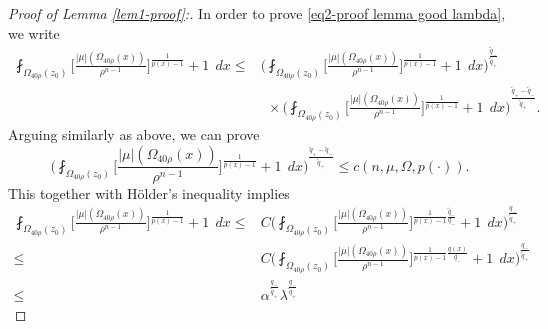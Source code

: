 \documentclass[a4paper,10pt]{amsart}
\newcommand{\f}{\frac}
\newcommand{\Om}{\Omega}
\begin{document}
\begin{proof}[Proof of Lemma \ref{lem1-proof}:]
        In order to prove \eqref{eq2-proof lemma good lambda}, we write
        $$
        \begin{aligned}
        \fint_{\Om_{40\rho}(z_0)}\Big[\f{|\mu|(\Om_{40\rho}(x))}{\rho^{n-1}}\Big]^{\f{1}{p(x)-1}}+1 \ \ dx\leq& \Big(\fint_{\Om_{40\rho}(z_0)}\Big[\f{|\mu|(\Om_{40\rho}(x))}{\rho^{n-1}}\Big]^{\f{1}{p(x)-1}}+1 \ \ dx\Big)^{\f{\tilde{q}_-}{\tilde{q}_+}}\\
        &\ \ \times\Big(\fint_{\Om_{40\rho}(z_0)}\Big[\f{|\mu|(\Om_{40\rho}(x))}{\rho^{n-1}}\Big]^{\f{1}{p(x)-1}}+1 \ \ dx\Big)^{\f{\tilde{q}_+-\tilde{q}_-}{\tilde{q}_+}}.
        \end{aligned}
        $$	
        Arguing similarly as above, we can prove
        $$
        \Big(\fint_{\Om_{40\rho}(z_0)}\Big[\f{|\mu|(\Om_{40\rho}(x))}{\rho^{n-1}}\Big]^{\f{1}{p(x)-1}}+1 \ \ dx\Big)^{\f{\tilde{q}_+-\tilde{q}_-}{\tilde{q}_+}}\leq c(n,\mu,\Om,p(\cdot)).
        $$	
        This together with H\"older's inequality implies
        $$
        \begin{aligned}
        \fint_{\Om_{40\rho}(z_0)}\Big[\f{|\mu|(\Om_{40\rho}(x))}{\rho^{n-1}}\Big]^{\f{1}{p(x)-1}}+1 \ \ dx\leq& C\Big(\fint_{\Om_{40\rho}(z_0)}\Big[\f{|\mu|(\Om_{40\rho}(x))}{\rho^{n-1}}\Big]^{\f{1}{p(x)-1}\f{\tilde{q}_-}{q_-}}+1 \ \ dx\Big)^{\f{q_-}{\tilde{q}_+}}\\
        \leq& C\Big(\fint_{\Om_{40\rho}(z_0)}\Big[\f{|\mu|(\Om_{40\rho}(x))}{\rho^{n-1}}\Big]^{\f{1}{p(x)-1}\f{q(x)}{q_-}}+1 \ \ dx\Big)^{\f{q_-}{\tilde{q}_+}}\\
        \leq& \alpha^{\f{q_-}{\tilde{q}_+}} \lambda^{\f{q_-}{\tilde{q}_+}} 
        \end{aligned}
        $$
	\end{proof}
	
\end{document}

